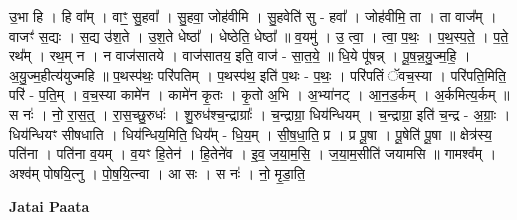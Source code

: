 \documentclass[17pt]{extarticle}
\begin{document}
उ॒भा हि । हि वा᳚म् । वाꣳ॒॒ सु॒हवा᳚ । सु॒हवा॒ जोह॑वीमि । सु॒हवेति॑ सु - हवा᳚ । जोह॑वीमि॒ ता । ता वाज᳚म् । वाजꣳ॑ स॒द्यः । स॒द्य उ॑श॒ते । उ॒श॒ते धेष्ठा᳚ । धेष्ठेति॒ धेष्ठा᳚ ॥ व॒यमु॑ । उ॒ त्वा॒ । त्वा॒ प॒थः॒ । प॒थ॒स्प॒ते॒ । प॒ते॒ रथ᳚म् । रथ॒म् न । न वाज॑सातये । वाज॑सातय॒ इति॒ वाज॑ - सा॒त॒ये॒ ॥ धि॒ये पू॑षन्न् । पू॒ष॒न्न॒यु॒ज्म॒हि॒ । अ॒यु॒ज्म॒हीत्य॑युज्महि ॥ प॒थस्प॑थः॒ परि॑पतिम् । प॒थस्प॑थ॒ इति॑ प॒थः - प॒थः॒ । परि॑पतिं ॅवच॒स्या । परि॑पति॒मिति॒ परि॑ - प॒ति॒म् । व॒च॒स्या कामे॑न । कामे॑न कृ॒तः । कृ॒तो अ॒भि । अ॒भ्या॑नट् । आ॒न॒ड॒र्कम् । अ॒र्कमित्य॒र्कम् ॥ स नः॑ । नो॒ रा॒स॒त्॒ । रा॒स॒च्छु॒रुधः॑ । शु॒रुध॑श्च॒न्द्राग्राः᳚ । च॒न्द्राग्रा॒ धिय॑न्धियम् । च॒न्द्राग्रा॒ इति॑ च॒न्द्र - अ॒ग्राः॒ । धिय॑न्धियꣳ सीषधाति । धिय॑न्धिय॒मिति॒ धिय᳚म् - धि॒य॒म् । सी॒ष॒धा॒ति॒ प्र । प्र पू॒षा । पू॒षेति॑ पू॒षा ॥ क्षेत्र॑स्य॒ पति॑ना । पति॑ना व॒यम् । व॒यꣳ हि॒तेन॑ । हि॒तेने॑व । इ॒व॒ ज॒या॒म॒सि॒ । ज॒या॒म॒सीति॑ जयामसि ॥ गामश्व᳚म् । अश्व॑म् पोषयि॒त्नु । पो॒ष॒यि॒त्न्वा । आ सः । स नः॑ । नो॒ मृ॒डा॒ति॒ \newline

\textbf{Jatai Paata} \newline
\end{document}
